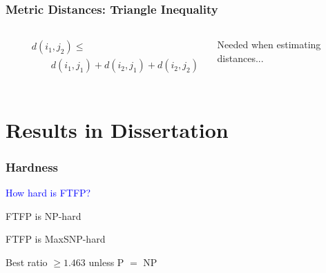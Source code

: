 \documentclass[hyperref,dvipsnames,svgnames,compress]{beamer}
\begin{document}
\begin{frame}
  \frametitle{Metric Distances: Triangle Inequality}
  \begin{columns}
    \begin{center}
    \end{center}

    \begin{block}{}
      \begin{align*}
    &d(i_1, j_2) \leq\\
    &\qquad d(i_1, j_1) + d(i_2, j_1) + d(i_2, j_2)\\
  \end{align*}
    \end{block}
    \begin{block}{}
      \color{blue}
      Needed when estimating distances...
    \end{block}
  \end{columns}

\end{frame}

\section[Results]{Results in Dissertation}

\begin{frame}
  \frametitle{Hardness}

  \begin{center}
  \huge{\textcolor{blue}{How hard is FTFP?}}
  \end{center}

  \begin{block}{}
    FTFP is NP-hard
  \end{block}

  \begin{block}{}
    FTFP is MaxSNP-hard
  \end{block}

  \begin{block}{}
    Best ratio $\geq 1.463$ unless P $=$ NP
  \end{block}
\end{frame}
\end{document}
